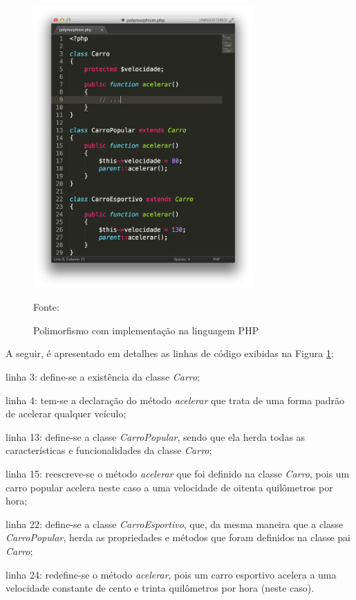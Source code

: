 \begin{figure}[h!tb]
	\caption{Polimorfismo com implementação na linguagem PHP}
	\label{fig:polimorfismo}

	\centering
	\includegraphics[width=0.75\textwidth]{images/polymorphism.png}

	\centering
	\footnotesize Fonte: \fonteOAutor
\end{figure}

\FloatBarrier 	%

A seguir, é apresentado em detalhes as linhas de código exibidas na Figura
\ref{fig:polimorfismo}:

\begin{alineas}
    \item linha 3: define-se a existência da classe \textit{Carro};
    \item linha 4: tem-se a declaração do método \textit{acelerar} que trata de
    uma forma padrão de acelerar qualquer veículo;
    \item linha 13: define-se a classe \textit{CarroPopular}, sendo que ela
    herda todas as características e funcionalidades da classe \textit{Carro};
    \item linha 15: reescreve-se o método \textit{acelerar} que foi definido na
    classe \textit{Carro}, pois um carro popular acelera neste caso a uma
    velocidade de oitenta quilômetros por hora;
    \item linha 22: define-se a classe \textit{CarroEsportivo}, que, da mesma
    maneira que a classe \textit{CarroPopular}, herda as propriedades e métodos
    que foram definidos na classe pai \textit{Carro};
    \item linha 24: redefine-se o método \textit{acelerar}, pois um carro
    esportivo acelera a uma velocidade constante de cento e trinta quilômetros
    por hora (neste caso).
\end{alineas}

